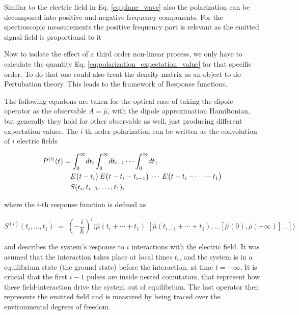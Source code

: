 \noindent
Similar to the electric field in Eq. \eqref{eq:plane_wave} also the polarization can be decomposed into positive and negative frequency components. For the spectroscopic measurements the positive frequency part is relevant as the emitted signal field is proportional to it  \cite{mukamel1995principlesnonlinearoptical}


\noindent
Now to isolate the effect of a third order non-linear process, we only have to calculate the quantity Eq. \eqref{eq:polarization_expectation_value} for that specific order.
To do that one could also treat the density matrix as an object to do Pertubation theory. This leads to the framework of Response functions. 

\noindent
The following equatons are taken for the optical case of taking the dipole operator as the observable $A = \hat{\mu}$, with the dipole approximation Hamiltonian, but generally they hold for other observable as well, just producing different expectation values. 
The $i$-th order polarization can be written as the convolution of $i$ electric fields \cite{hamm2005principlesnonlinearoptical}

\begin{align}
	P^{(i)}(t) &= \int_{0}^{\infty}\! dt_{i} \int_{0}^{\infty}\! dt_{i-1} \cdots \int_{0}^{\infty}\! dt_{1} \notag \\
	&\quad E\bigl(t-t_{i}\bigr)\, E\bigl(t-t_{i}-t_{i-1}\bigr)\,\cdots\, E\bigl(t-t_{i}-\cdots - t_{1}\bigr) \notag \\
	&\quad S(t_{i},t_{i-1},\ldots,t_{1}),
	\label{eq:response_convolution}
\end{align}

\noindent
where the $i$-th response function is defined as

\begin{equation}
	S^{(i)}(t_{i},\ldots,t_{1})
	\;=\;
	\left(-\frac{i}{\hbar}\right)^{i}
	\Big\langle
	\hat{\mu}(t_{i}+\cdots + t_{1})\;[\hat{\mu}(t_{i-1}+\cdots + t_{1}),\ldots [\hat{\mu}(0),\rho(-\infty)]\ldots]
	\Big\rangle
	\label{eq:response_function_S}
\end{equation}

\noindent
and describes the system's response to $i$ interactions with the electric field.
It was asumed that the interaction takes place at local times $t_i$, and the system is in a equilibrium state (the ground state) before the interaction, at time $t = - \infty$.
It is crucial that the first $i-1$ pulses are inside nested comutators, that represent how these field-interaction drive the system out of equilibrium. The last operator then represents the emitted field and is measured by being traced over the environmental degrees of freedom.

